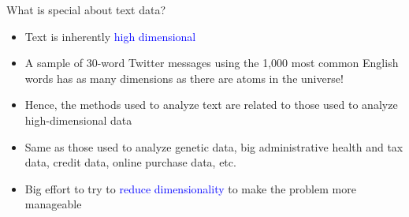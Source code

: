 \documentclass[english]{beamer}
\begin{document}
\begin{frame}{What is special about text data?}
\begin{itemize}
\setlength{\itemsep}{0.9em}
\item Text is inherently \textcolor{blue}{high dimensional}
\item A sample of 30-word Twitter messages using the 1,000 most common English words has as many dimensions as there are atoms in the universe!
\item Hence, the methods used to analyze text are related to those used to analyze high-dimensional data
\item Same as those used to analyze genetic data, big administrative health and tax data, credit data, online purchase data, etc.
\item Big effort to try to \textcolor{blue}{reduce dimensionality} to make the problem more manageable 

% 
%
\end{itemize}

\end{frame}
\end{document}
